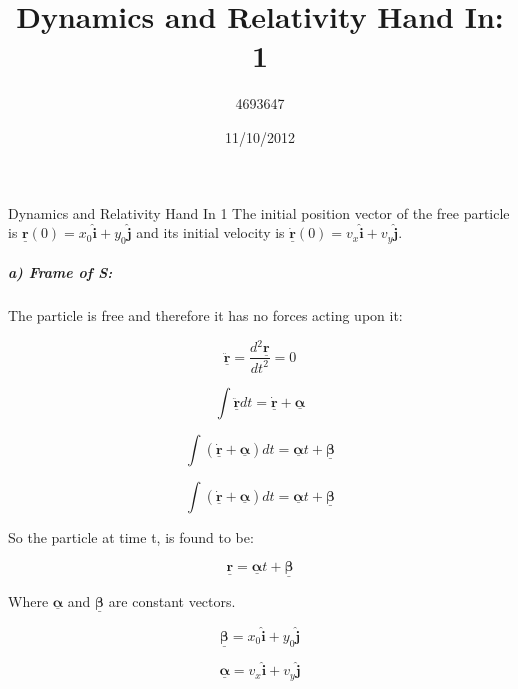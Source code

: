 \documentclass[a4paper,11pt]{scrartcl}
\title{Dynamics and Relativity Hand In: 1}
\date{11/10/2012}
\author{4693647}
\begin{document}
\maketitle Dynamics and Relativity Hand In 1
The initial position vector of the free particle is $\underline{\mathbf{r}}(0)=x_{0}\hat{\mathbf{i}} + y_0\hat{\mathbf{j}}$ and its initial velocity is 
$\dot{\underline{\mathbf{r}}}(0)=v_x\hat{\mathbf{i}} + v_{y}\hat{\mathbf{j}}$.

\subparagraph{a) Frame of S:}

The particle is free and therefore it has no forces acting upon it: 

 
\begin{equation}
\ddot{\underline{\mathbf{r}}} = \frac{d{^2}\underline{\mathbf{r}}}{dt^2}= 0
\end{equation}

\begin{equation}
\int{\ddot{\underline{\mathbf{r} } }}dt=\dot{\underline{\mathbf{r}}}+\underline{\mathbf{\alpha} }
\end{equation}

\begin{equation}
\int{ (\dot{\underline{\mathbf{r}}}+\underline{\mathbf{\alpha}})dt}=\underline{\mathbf{\alpha}}t+\underline{\mathbf{\beta}}	
\end{equation}

\begin{equation}	
\int{ (\dot{\underline{\mathbf{r}}}+\underline{\mathbf{\alpha}})dt}=\underline{\mathbf{\alpha}}t+\underline{\mathbf{\beta}}
\end{equation}

So the particle at time t, is found to be:


\begin{equation}
\underline{\mathbf{r}}=\underline{\mathbf{\alpha}}t+\underline{\mathbf{\beta}}
\end{equation}


Where $\underline{\mathbf{\alpha}}$ and $\underline{\mathbf{\beta}}$ are constant vectors.

\begin{equation}
\underline{\mathbf{\beta}}=x_0\hat{\mathbf{i}}+y_0\hat{\mathbf{j}}	
\end{equation}



\begin{equation}
\underline{\mathbf{\alpha}}=v_x\hat{\mathbf{i}}+v_y\hat{\mathbf{j}}	
\end{equation}
\end{document}
